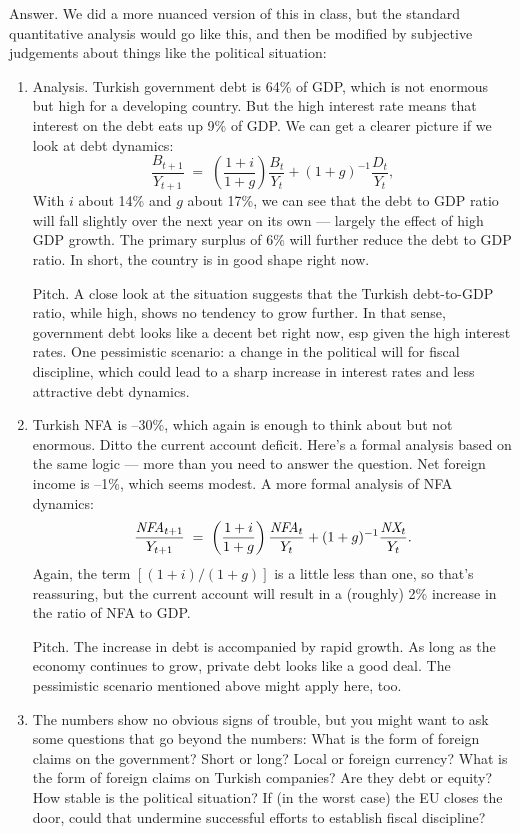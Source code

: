 \documentclass[letterpaper,12pt]{article}
\begin{document}
\begin{enumerate}
Answer.  We did a more nuanced version of this in class, but the
standard quantitative analysis would go like this, and then be
modified by subjective judgements about things like the political
situation:
\begin{enumerate}
\item Analysis.
Turkish government debt is 64\% of GDP, which is not enormous but
high for a developing country.  But the high interest rate means
that interest on the debt eats up 9\% of GDP. We can get a clearer
picture if we look at debt dynamics:
\[
    \frac{B_{t+1}}{Y_{t+1}} \;=\; \left( \frac{1+i}{1+g} \right)
     \frac{B_{t}}{Y_{t}}
     + (1+g)^{-1} \frac{D_{t}}{Y_{t}} ,
\]
With $i$ about 14\% and $g$ about 17\%, we can see that the debt to GDP ratio
will fall slightly over the next year on its own --- largely the effect of
high GDP growth.
The primary surplus of 6\% will further reduce the debt to GDP ratio.
In short, the country is in good shape right now.

Pitch.  A close look at the situation suggests that the Turkish
debt-to-GDP ratio, while high, shows no tendency to grow further. In
that sense, government debt looks like a decent bet right now, esp
given the high interest rates.  One pessimistic scenario:  a change
in the political will for fiscal discipline, which could lead to a
sharp increase in interest rates and less attractive debt dynamics.


\item Turkish NFA is --30\%, 
which again is enough to think about but not enormous.
Ditto the current account deficit.
Here's a formal analysis based on the same logic ---
more than you need to answer the question.
Net foreign income is --1\%, which seems modest.
A more formal analysis of NFA dynamics:
\[
    \frac{\mbox{\em NFA}_{t+1}}{Y_{t+1}} \;=\; \left( \frac{1+i}{1+g} \right)
     \frac{\mbox{\em NFA}_{t}}{Y_{t}} + (1+g)^{-1} \frac{\mbox{\em NX}_{t}}{Y_{t}} .
\]
Again, the term $[(1+i)/(1+g)]$ is a little less than one, so that's reassuring,
but the current account will result in a (roughly) 2\% increase in the ratio
of NFA to GDP.


Pitch.  The increase in debt is accompanied by rapid growth. As long
as the economy continues to grow, private debt looks like a good
deal. The pessimistic scenario mentioned above might apply here,
too.

\item  The numbers show no obvious signs of trouble,
but you might want to ask some questions that go beyond the numbers:
What is the form of foreign claims on the government? Short or long?
Local or foreign currency? What is the form of foreign claims on
Turkish companies? Are they debt or equity?  How stable is the
political situation? If (in the worst case) the EU closes the door,
could that undermine successful efforts to establish fiscal
discipline?
\end{enumerate}



\end{enumerate}
\end{document}

